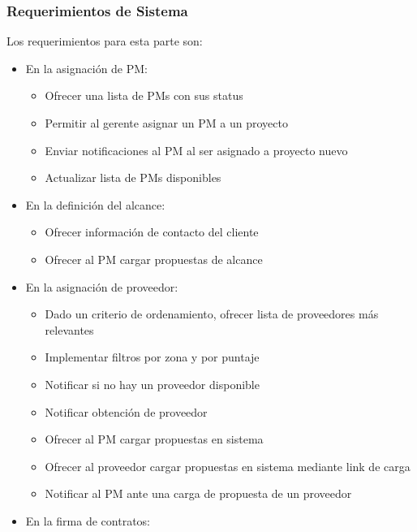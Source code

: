 \subsubsection{Requerimientos de Sistema}
Los requerimientos para esta parte son:
\begin{itemize}
	\item En la asignación de PM:
	\begin{itemize}
		\item Ofrecer una lista de PMs con sus status
		\item Permitir al gerente asignar un PM a un proyecto %
		\item Enviar notificaciones al PM al ser asignado a proyecto nuevo
		\item Actualizar lista de PMs disponibles
	\end{itemize}
	\item En la definición del alcance:
	\begin{itemize}
		\item Ofrecer información de contacto del cliente
		\item Ofrecer al PM cargar propuestas de alcance
	\end{itemize}
	\item En la asignación de proveedor:
	\begin{itemize}
		\item Dado un criterio de ordenamiento, ofrecer lista de proveedores más relevantes
		\item Implementar filtros por zona y por puntaje
		\item Notificar si no hay un proveedor disponible
		\item Notificar obtención de proveedor %
		\item Ofrecer al PM cargar propuestas en sistema
		\item Ofrecer al proveedor cargar propuestas en sistema mediante link de carga
		\item Notificar al PM ante una carga de propuesta de un proveedor
	\end{itemize}
	\item En la firma de contratos: %
\end{itemize}

